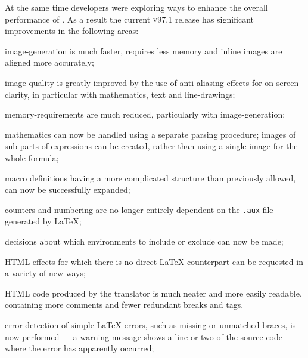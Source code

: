 At the same time developers were exploring ways to enhance the overall
performance of \latextohtml.
As a result the current \textsc{v97.1} release has significant improvements in
the following areas:
%
\begin{htmllist}
% 
\item[image-generation]
is much faster, requires less memory
and inline images are aligned more accurately; 
%
\item[image quality]
is greatly improved by the use of anti-aliasing effects for on-screen clarity,
in particular with mathematics, text and line-drawings; 
%
\item[memory-requirements]
are much reduced, particularly with image-generation;
%
\item[mathematics]
can now be handled using a separate parsing procedure;
images of sub-parts of expressions can be created, rather
than using a single image for the whole formula;
%
\item[macro definitions]
having a more complicated structure than previously allowed,
can now be successfully expanded;
%
\item[counters]
and numbering are no longer entirely dependent on the \texttt{.aux}
file generated by \LaTeX;
%
\item[decisions]
about which environments to include or exclude can now be made;
%
\item[HTML effects]
for which there is no direct \LaTeX{} counterpart
can be requested in a variety of new ways;
%
\item[HTML code]
produced by the translator is much neater and more easily readable,
containing more comments and fewer redundant breaks and  tags.
%
\item[error-detection]
of simple \LaTeX{} errors, such as missing or unmatched braces, 
is now performed --- a warning message shows a line or two
of the source code where the error has apparently occurred;
%
\end{htmllist} 


